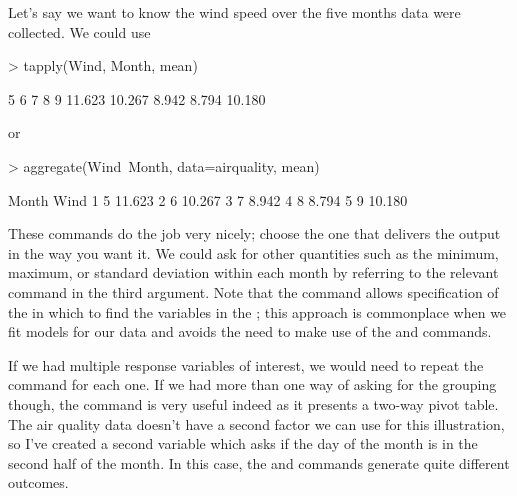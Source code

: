 Let's say we want to know the  wind speed over the five months data were collected. We could use 

\begin{Schunk}
\begin{Sinput}
> tapply(Wind, Month, mean) 
\end{Sinput}
\begin{Soutput}
     5      6      7      8      9 
11.623 10.267  8.942  8.794 10.180 
\end{Soutput}
\end{Schunk}
 or %

\begin{Schunk}
\begin{Sinput}
> aggregate(Wind~Month, data=airquality, mean) 
\end{Sinput}
\begin{Soutput}
  Month   Wind
1     5 11.623
2     6 10.267
3     7  8.942
4     8  8.794
5     9 10.180
\end{Soutput}
\end{Schunk}

These commands do the job very nicely; choose the one that delivers the output in the way you want it. We could ask for other quantities such as the minimum, maximum, or standard deviation within each month by referring to the relevant \R{} command in the third argument. Note that the  command allows specification of the  in which to find the variables in the ; this approach is commonplace when we fit models for our data and avoids the need to make use of the  and  commands.  
 
If we had multiple response variables of interest, we would need to repeat the command for each one. If we had more than one way of asking for the grouping though, the  command is very useful indeed as it presents a two-way pivot table. The air quality data doesn't have a second factor we can use for this illustration, so I've created a second variable which asks if the day of the month is in the second half of the month. In this case, the  and  commands generate quite different outcomes.

